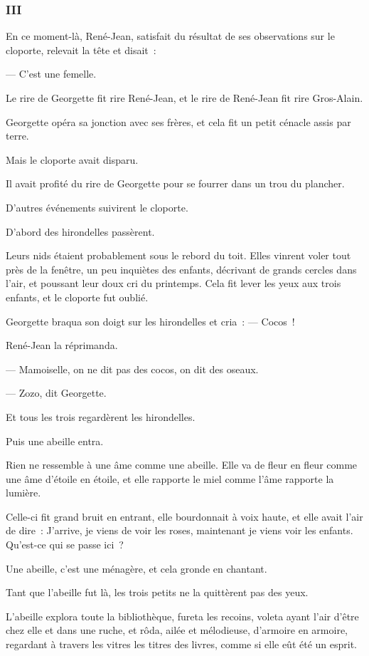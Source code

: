 \documentclass[french,twoside]{book} %
\begin{document}
\subsubsection[{III}]{III}
\label{p3l3c3}
\noindent En ce moment-là, René-Jean, satisfait du résultat de ses observations sur le cloporte, relevait la tête et disait :\par
— C’est une femelle.\par
Le rire de Georgette fit rire René-Jean, et le rire de René-Jean fit rire Gros-Alain.\par
Georgette opéra sa jonction avec ses frères, et cela fit un petit cénacle assis par terre.\par
Mais le cloporte avait disparu.\par
Il avait profité du rire de Georgette pour se fourrer dans un trou du plancher.\par
 D’autres événements suivirent le cloporte.\par
D’abord des hirondelles passèrent.\par
Leurs nids étaient probablement sous le rebord du toit. Elles vinrent voler tout près de la fenêtre, un peu inquiètes des enfants, décrivant de grands cercles dans l’air, et poussant leur doux cri du printemps. Cela fit lever les yeux aux trois enfants, et le cloporte fut oublié.\par
Georgette braqua son doigt sur les hirondelles et cria : — Cocos !\par
René-Jean la réprimanda.\par
— Mamoiselle, on ne dit pas des cocos, on dit des oseaux.\par
— Zozo, dit Georgette.\par
Et tous les trois regardèrent les hirondelles.\par
Puis une abeille entra.\par
Rien ne ressemble à une âme comme une abeille. Elle va de fleur en fleur comme une âme d’étoile en étoile, et elle rapporte le miel comme l’âme rapporte la lumière.\par
Celle-ci fit grand bruit en entrant, elle bourdonnait à voix haute, et elle avait l’air de dire : J’arrive, je viens de voir les roses, maintenant je viens voir les enfants. Qu’est-ce qui se passe ici ?\par
Une abeille, c’est une ménagère, et cela gronde en chantant.\par
Tant que l’abeille fut là, les trois petits ne la quittèrent pas des yeux.\par
L’abeille explora toute la bibliothèque, fureta les recoins, voleta ayant l’air d’être chez elle et dans une  ruche, et rôda, ailée et mélodieuse, d’armoire en armoire, regardant à travers les vitres les titres des livres, comme si elle eût été un esprit.\par
\end{document}
